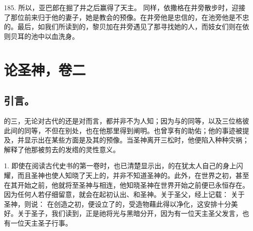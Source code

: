 185. 所以，亚巴郎在掘了井之后赢得了天主。 同样，依撒格在井旁散步时，迎接了那位前来归于他的妻子，她是教会的预像。在井旁他是忠信的，在池旁他是不忠的。最后，如我们所读到的，黎贝加在井旁遇见了那寻找她的人，而妓女们则在依则贝耳的池中以血洗身。\par



\section{论圣神，卷二}


\subsection{引言。}

的三，无论对古代的还是对而言，都并非不为人知；因为与的同等，以及三位格彼此间的同等，不但在别处，也在他那里得到阐明。也曾享有的助佑；他的事迹被提及，并显示出在某些方面是及其的预像。当圣神离开三松时，他便陷入种种灾祸；解释了他那被剪去的发绺的灵性意义。\par

1. 即使在阅读古代史书的第一卷时，也已清楚显示出，的在犹太人自己的身上闪耀，而且圣神也使人知晓了天上的，并非不知道圣神的。此外，在世界之初，甚至在其开始之前，他就将至圣神与相连，他知晓圣神在世界开始之前便已永恒存在。因为任何人若仔细留意，就会在起初认出、和圣神。关于圣父，经上记载： 关于圣神，则说： 在创造之初，便设立了的，受造物藉此得以净化，这安排十分美好。关于圣子，我们读到，正是祂将光与黑暗分开，因为有一位天主圣父发言，也有一位天主圣子行事。\par

